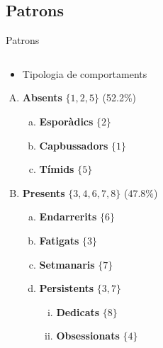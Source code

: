 \documentclass[xcolor=x11names,
								compress,
								aspectratio=1610]{beamer}
\theoremstyle{definition}%
\renewcommand{\(}{\begin{columns}}
\renewcommand{\)}{\end{columns}}
\newcommand{\<}[1]{\begin{column}{#1}}
\renewcommand{\>}{\end{column}}
\begin{document}
\subsection{Patrons}
\begin{frame}{Patrons}
	\begin{columns}[onlytextwidth]
		\begin{column}{.5\textwidth}
    	\begin{itemize}
    	\item Tipologia de comportaments
    	\end{itemize}
    		\begin{enumerate}[A.]
    		\item \textbf{Absents} $\{1,2,5\}$ (52.2\%)	
    			\begin{enumerate}[a.]
    			\item \textbf{Esporàdics} $\{2\}$
    			\item \textbf{Capbussadors} $\{1\}$
    			\item \textbf{Tímids} $\{5\}$
    			\end{enumerate}
    		\item \textbf{Presents} $\{3,4,6,7,8\}$ ($47.8\%$)
    			\begin{enumerate}[a.]	
    			\item \textbf{Endarrerits} $\{6\}$	
    			\item \textbf{Fatigats} $\{3\}$
    			\item \textbf{Setmanaris} $\{7\}$
    			\item \textbf{Persistents} $\{3,7\}$
    				\begin{enumerate}[i.]
    				\item \textbf{Dedicats} $\{8\}$
    				\item \textbf{Obsessionats} $\{4\}$ 
    				\end{enumerate} 
    			\end{enumerate}	
    		\end{enumerate}
		\end{column}
		\begin{column}{.5\textwidth}
		\begin{center}

\end{center}
\end{column}
\end{columns}
\end{frame}
\end{document}
